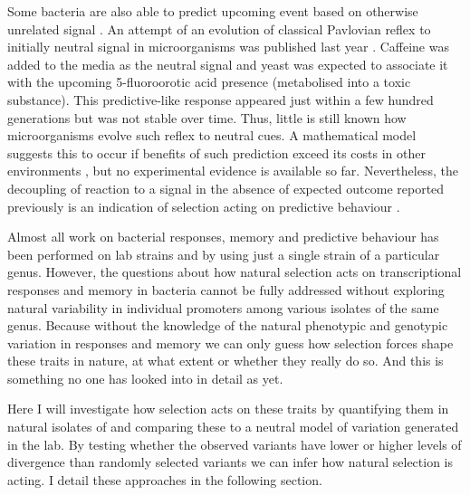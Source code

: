 Some bacteria are also able to predict upcoming event based on otherwise unrelated signal \cite{kondo1993circadian, min2005rhythmic, tagkopoulos2008predictive, mitchell2009adaptive}.
An attempt of an evolution of classical Pavlovian reflex to initially neutral signal in microorganisms was published last year \cite{lopez2017adaptive}.
Caffeine was added to the media as the neutral signal and yeast  was expected to associate it with the upcoming 5-fluoroorotic acid presence (metabolised into a toxic substance).
This predictive-like response appeared just within a few hundred generations but was not stable over time.
Thus, little is still known how microorganisms evolve such reflex to neutral cues.
A mathematical model suggests this to occur if benefits of such prediction exceed its costs in other environments \cite{mitchell2011mathematical}, but no experimental evidence is available so far.
Nevertheless, the decoupling of reaction to a signal in the absence of expected outcome reported previously is an indication of selection acting on predictive behaviour \cite{tagkopoulos2008predictive, mitchell2009adaptive}.

Almost all work on bacterial responses, memory and predictive behaviour has been performed on lab strains and by using just a single strain of a particular genus.
However, the questions about how natural selection acts on transcriptional responses and memory in bacteria cannot be fully addressed without exploring natural variability in individual promoters among various isolates of the same genus.
Because without the knowledge of the natural phenotypic and genotypic variation in responses and memory we can only guess how selection forces shape these traits in nature, at what extent or whether they really do so.
And this is something no one has looked into in detail as yet.

Here I will investigate how selection acts on these traits by quantifying them in natural isolates of  and comparing these to a neutral model of variation generated in the lab.
By testing whether the observed variants have lower or higher levels of divergence than randomly selected variants we can infer how natural selection is acting.
I detail these approaches in the following section.

